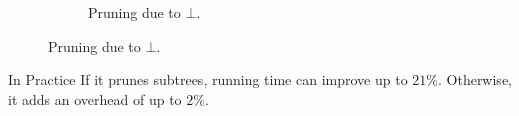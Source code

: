 \documentclass[english, aspectratio=169]{beamer}
\begin{document}
\begin{frame}
\begin{figure}
\begin{subfigure}{0.49\linewidth}

      \caption{Pruning due to $\bot$.}
    \end{subfigure}
  \end{figure}

  \begin{block}{In Practice}
    If it prunes subtrees, running time can improve up to $21\%$. Otherwise, it adds an overhead of
    up to $2\%$.
  \end{block}
\end{frame}
\end{document}
